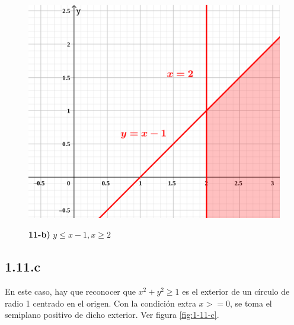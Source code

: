 \documentclass{article}
\begin{document}
\begin{figure}[ht]
\caption{\textbf{11-b)} $y \leq x - 1, x \geq 2$}
\includegraphics[scale=1.75]{../img/exercises/guide_01/11_b.png} 
\centering
\label{fig:1-11-b}
\end{figure}

\subsection*{1.11.c}
\label{subsec:1.11.c}

En este caso, hay que reconocer que $x^2 + y^2 \geq 1$ es el exterior de un círculo de radio 1 centrado en el origen. Con la condición extra $x >= 0$, se toma el semiplano positivo de dicho exterior. Ver figura \ref{fig:1-11-c}.
\end{document}
